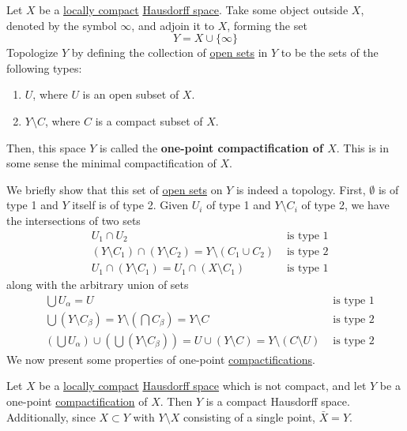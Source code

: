   \begin{definition}[Compactification]
    \label{def:compactification}
    Let $X$ be a \hyperref[def:locally-compact]{locally compact} \hyperref[def:hausdorff-space]{Hausdorff space}. Take some object outside $X$, denoted by the symbol $\infty$, and adjoin it to $X$, forming the set
    \begin{equation}
      Y = X \cup \{\infty\}
    \end{equation}
    Topologize $Y$ by defining the collection of \hyperref[def:open-set]{open sets} in $Y$ to be the sets of the following types:
    \begin{enumerate}
      \item $U$, where $U$ is an open subset of $X$. 
      \item $Y \setminus C$, where $C$ is a compact subset of $X$.
    \end{enumerate}
    Then, this space $Y$ is called the \textbf{one-point compactification of $X$}. This is in some sense the minimal compactification of $X$. 
  \end{definition}

  We briefly show that this set of \hyperref[def:open-set]{open sets} on $Y$ is indeed a topology. First, $\emptyset$ is of type 1 and $Y$ itself is of type 2. Given $U_i$ of type 1 and $Y \setminus C_i$ of type 2, we have the intersections of two sets
  \begin{align*}
    &U_1 \cap U_2 & \text{ is type 1} \\
    &(Y \setminus C_1) \cap (Y \setminus C_2) = Y \setminus (C_1 \cup C_2) & \text{ is type 2} \\
    &U_1 \cap (Y \setminus C_1) = U_1 \cap (X \setminus C_1) & \text{ is type 1} 
  \end{align*}
  along with the arbitrary union of sets
  \begin{align*}
    &\bigcup U_\alpha = U & \text{ is type 1} \\
    &\bigcup (Y \setminus C_\beta) = Y \setminus (\bigcap C_\beta) = Y \setminus C & \text{ is type 2} \\
    &(\bigcup U_\alpha) \cup ( \bigcup (Y \setminus C_\beta)) = U \cup (Y \setminus C) = Y \setminus (C \setminus U) & \text{ is type 2}
  \end{align*}
  We now present some properties of one-point \hyperref[def:compactification]{compactifications}. 

  \begin{theorem}
    \label{thm:structure-of-the-one-point-compactification}
    Let $X$ be a \hyperref[def:locally-compact]{locally compact} \hyperref[def:hausdorff-space]{Hausdorff space} which is not compact, and let $Y$ be a one-point \hyperref[def:compactification]{compactification} of $X$. Then $Y$ is a compact Hausdorff space. Additionally, since $X \subset Y$ with $Y \setminus X$ consisting of a single point, $\bar{X} = Y$. 
  \end{theorem}

